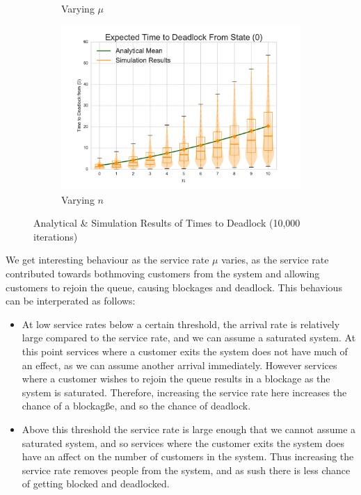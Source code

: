 \documentclass{article}
\begin{document}
\begin{figure}
\begin{subfigure}[b]{0.5\textwidth}
  \caption{Varying $\mu$}
  \label{fig:timestodeadlock_mu}
\end{subfigure}
\begin{subfigure}[b]{0.5\textwidth}
  \includegraphics[width=\textwidth]{images/varyn}
  \caption{Varying $n$}
  \label{fig:timestodeadlock_n}
\end{subfigure}
\caption{Analytical \& Simulation Results of Times to Deadlock (10,000 iterations)}
\label{fig:timestodeadlock}
\end{figure}

We get interesting behaviour as the service rate $\mu$ varies, as the service rate contributed towards bothmoving customers from the system and allowing customers to rejoin the queue, causing blockages and deadlock.
This behavious can be interperated as follows:
\begin{itemize}
\item At low service rates below a certain threshold, the arrival rate is relatively large compared to the service rate, and we can assume a saturated system.
At this point services where a customer exits the system does not have much of an effect, as we can assume another arrival immediately.
However services where a customer wishes to rejoin the queue results in a blockage as the system is saturated.
Therefore, increasing the service rate here increases the chance of a blockagße, and so the chance of deadlock.
\item Above this threshold the service rate is large enough that we cannot assume a saturated system, and so services where the customer exits the system does have an affect on the number of customers in the system.
Thus increasing the service rate removes people from the system, and as sush there is less chance of getting blocked and deadlocked.
\end{itemize}
\end{document}
